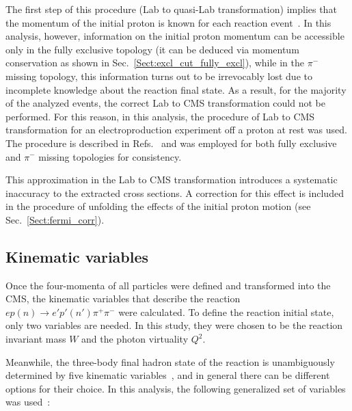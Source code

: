\documentclass[prc,twocolumn,superscriptaddress,showpacs,amssymb,amsmath,amsfonts,aps,nofootinbib]{revtex4-1}
\begin{document}
The first step of this procedure (Lab to quasi-Lab transformation) implies that the momentum of the initial proton is known for each reaction event~\cite{twopeg-d}. In this analysis, however, information on the initial proton momentum can be accessible only in the fully exclusive topology (it can be deduced via momentum conservation as shown in Sec.\!~\ref{Sect:excl_cut_fully_excl}), while in the $\pi^{-}$ missing topology, this information turns out to be irrevocably lost due to incomplete knowledge about the reaction final state. As a result, for the majority of the analyzed events, the correct Lab to CMS transformation could not be performed. For this reason, in this analysis, the procedure of Lab to CMS transformation for an electroproduction experiment off a proton at rest was used. The procedure is described in Refs.\!~\cite{Fed_an_note:2017,Fed_paper_2018,my_an_note:2020, my_thesis:2021} and was employed for both fully exclusive and $\pi^{-}$ missing topologies for consistency.


This approximation in the Lab to CMS transformation introduces a systematic inaccuracy to the extracted cross sections. A correction for this effect is included in the procedure of unfolding the effects of the initial proton motion (see Sec.\!~\ref{Sect:fermi_corr}).



\subsection{Kinematic variables}
\label{Sect:kin_var}

Once the four-momenta of all particles were defined and transformed into the CMS, the kinematic variables that describe the reaction $ep(n) \rightarrow e'p'(n')\pi^{+}\pi^{-}$ were calculated. To define the reaction initial state, only two variables are needed. In this study, they were chosen to be the reaction invariant mass $W$ and the photon virtuality $Q^{2}$.

Meanwhile, the three-body final hadron state of the reaction is unambiguously determined by five kinematic variables~\cite{Fed_an_note:2017}, and in general there can be different options for their choice. In this analysis, the following generalized set of variables was used~\cite{Fed_an_note:2017,Fed_paper_2018,Byckling:1971vca,Isupov:2017lnd,Fedotov:2008aa,Mokeev:2015lda,my_an_note:2020, my_thesis:2021}:\vspace{-0.25em}
\end{document}
